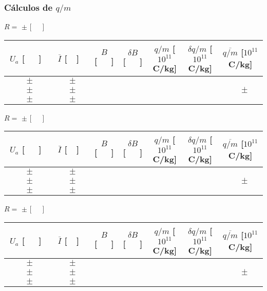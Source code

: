 \documentclass[a4paper,12pt]{article}  %
\begin{document}
\subsubsection{\sf Cálculos de $q/m$}
\label{sec:calc}
\begin{center}
	\noindent	$R =$ \underline{\makebox[1.5cm][r]{~}}  $\pm$  	\underline{\makebox[1cm][r]{~}}  [~~~]
	\begin{tabular}{|c|c|c|c|c|c|c|}
	\hline %
	  $U_a$ [~~~] & $\overline{I}$ [~~] &  $B$ [~~~] & $\delta B$  [~~~] & $q/m$ [$10^{11}$C/kg] & $\delta q/m$ [$10^{11}$C/kg] & $\overline{q/m}$ [$10^{11}$C/kg]\\ \hline %
	 $\qquad \pm \quad$ &$\qquad \pm \quad$&&&&& \\ \cline{2-6}
	$\qquad \pm \quad$ &$\qquad \pm \quad$&&&&& $\qquad \pm \quad$   \\ \cline{2-6}
	 $\qquad \pm \quad$ &$\qquad \pm \quad$&&&&& \\ \hline 
 	\end{tabular}

	\noindent	$R =$ \underline{\makebox[1.5cm][r]{~}}  $\pm$  	\underline{\makebox[1cm][r]{~}}  [~~~]
	\begin{tabular}{|c|c|c|c|c|c|c|}  
	\hline %
	  $U_a$ [~~~] & $\overline{I}$ [~~] &  $B$ [~~~] & $\delta B$  [~~~] & $q/m$ [$10^{11}$C/kg] & $\delta q/m$ [$10^{11}$C/kg] & $\overline{q/m}$ [$10^{11}$C/kg]\\ \hline 
	 $\qquad \pm \quad$ &$\qquad \pm \quad$&&&&& \\ \cline{2-6}
	 $\qquad \pm \quad$ &$\qquad \pm \quad$&&&&& $\qquad \pm \quad$ \\ \cline{2-6}
	 $\qquad \pm \quad$ &$\qquad \pm \quad$&&&&& \\
	 \hline 
	\end{tabular}

	\noindent	$R =$ \underline{\makebox[1.5cm][r]{~}}  $\pm$  	\underline{\makebox[1cm][r]{~}}  [~~~]
	\begin{tabular}{|c|c|c|c|c|c|c|}  
	\hline %
	  $U_a$ [~~~] & $\overline{I}$ [~~] &  $B$ [~~~] & $\delta B$  [~~~] & $q/m$ [$10^{11}$C/kg] & $\delta q/m$ [$10^{11}$C/kg] & $\overline{q/m}$ [$10^{11}$C/kg]\\ \hline 
	 $\qquad \pm \quad$ &$\qquad \pm \quad$&&&&& \\ \cline{2-6}
	 $\qquad \pm \quad$ &$\qquad \pm \quad$&&&&& $\qquad \pm \quad$ \\ \cline{2-6}
	 $\qquad \pm \quad$ &$\qquad \pm \quad$&&&&& \\
	 \hline 
	\end{tabular}


\end{center}
\end{document}
